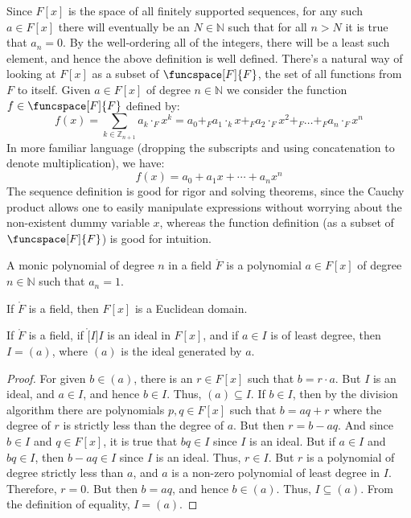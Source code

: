    Since $F[x]$ is the space of all finitely supported sequences, for any
    such $a\in{F}[x]$ there will eventually be an $N\in\mathbb{N}$ such that
    for all $n>N$ it is true that $a_{n}=0$. By the well-ordering all of the
    integers, there will be a least such element, and hence the above
    definition is well defined. There's a natural way of looking at
    $F[x]$ as a subset of $\funcspace[F]{F}$, the set of all functions from
    $F$ to itself. Given $a\in{F}[x]$ of degree $n\in\mathbb{N}$ we consider
    the function $f\in\funcspace[F]{F}$ defined by:
    \begin{equation}
        f(x)=\sum_{k\in\mathbb{Z}_{n+1}}a_{k}\cdot_{F}x^{k}
        =a_{0}+_{F}a_{1}\cdot_{k}x+_{F}a_{2}\cdot_{F}x^{2}+_{F}\dots
        +_{F}a_{n}\cdot_{F}x^{n}
    \end{equation}
    In more familiar language (dropping the subscripts and using
    concatenation to denote multiplication), we have:
    \begin{equation}
        f(x)=a_{0}+a_{1}x+\cdots+a_{n}x^{n}
    \end{equation}
    The sequence definition is good for rigor and solving theorems, since
    the Cauchy product allows one to easily manipulate expressions without
    worrying about the non-existent dummy variable $x$, whereas the function
    definition (as a subset of $\funcspace[F]{F}$) is good for intuition.
    \begin{definition}
        A monic polynomial of degree $n$ in a field $\ring{F}$ is a
        polynomial $a\in{F}[x]$ of degree $n\in\mathbb{N}$ such that
        $a_{n}=1$.
    \end{definition} 
    \begin{theorem}
        If $\ring{F}$ is a field, then $F[x]$ is a Euclidean domain.
    \end{theorem}
    \begin{theorem}
        If $\ring{F}$ is a field, if $\ring[I]{I}$ is an ideal in $F[x]$,
        and if $a\in{I}$ is of least degree, then $I=(a)$, where $(a)$ is
        the ideal generated by $a$.
    \end{theorem}
    \begin{proof}
        For given $b\in(a)$, there is an $r\in{F}[x]$ such that
        $b=r\cdot{a}$. But $I$ is an ideal, and $a\in{I}$, and hence
        $b\in{I}$. Thus, $(a)\subseteq{I}$. If $b\in{I}$, then by the
        division algorithm there are polynomials $p,q\in{F}[x]$ such that
        $b=aq+r$ where the degree of $r$ is strictly less than the degree of
        $a$. But then $r=b-aq$. And since $b\in{I}$ and $q\in{F}[x]$, it is
        true that $bq\in{I}$ since $I$ is an ideal. But if $a\in{I}$ and
        $bq\in{I}$, then $b-aq\in{I}$ since $I$ is an ideal. Thus,
        $r\in{I}$. But $r$ is a polynomial of degree strictly less than
        $a$, and $a$ is a non-zero polynomial of least degree in $I$.
        Therefore, $r=0$. But then $b=aq$, and hence $b\in(a)$. Thus,
        $I\subseteq(a)$. From the definition of equality, $I=(a)$.
    \end{proof}
